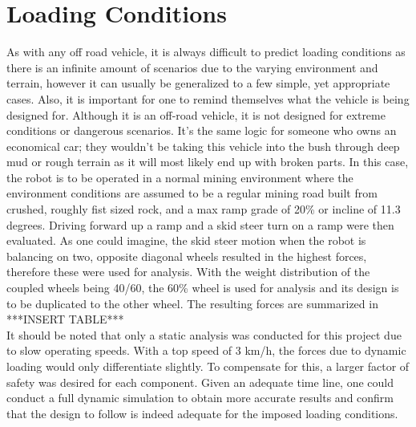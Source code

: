\section{Loading Conditions}
As with any off road vehicle, it is always difficult to predict loading conditions as there is an infinite amount of scenarios due to the varying environment and terrain, however it can usually be generalized to a few simple, yet appropriate cases. Also, it is important for one to remind themselves what the vehicle is being designed for. Although it is an off-road vehicle, it is not designed for extreme conditions or dangerous scenarios. It's the same logic for someone who owns an economical car; they wouldn't be taking this vehicle into the bush through deep mud or rough terrain as it will most likely end up with broken parts. In this case, the robot is to be operated in a normal mining environment where the environment conditions are assumed to be a regular mining road built from crushed, roughly fist sized rock, and a max ramp grade of 20\% or incline of 11.3 degrees. Driving forward up a ramp and a skid steer turn on a ramp were then evaluated. As one could imagine, the skid steer motion when the robot is balancing on two, opposite diagonal wheels resulted in the highest forces, therefore these were used for analysis. With the weight distribution of the coupled wheels being 40/60, the 60\% wheel is used for analysis and its design is to be duplicated to the other wheel. The resulting forces are summarized in     
\\
 ***INSERT TABLE***
\\
It should be noted that only a static analysis was conducted for this project due to slow operating speeds. With a top speed of 3 km/h, the forces due to dynamic loading would only differentiate slightly. To compensate for this, a larger factor of safety was desired for each component. Given an adequate time line, one could conduct a full dynamic simulation to obtain more accurate results and confirm that the design to follow is indeed adequate for the imposed loading conditions. 






